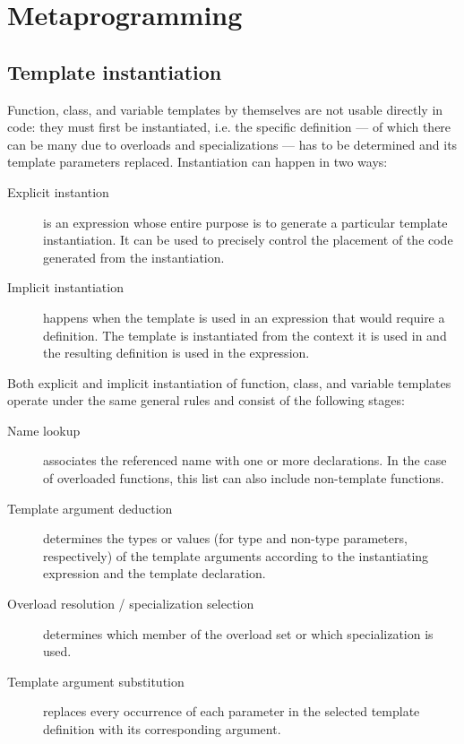 \section{Metaprogramming}

\label{sec:c++:meta}

\subsection{Template instantiation}

Function, class, and variable templates by themselves are not usable directly in
code: they must first be instantiated, i.e. the specific definition --- of which
there can be many due to overloads and specializations --- has to be determined
and its template parameters replaced.  Instantiation can happen in two ways:

\begin{description}
    \item[Explicit instantion]
        is an expression whose entire purpose is to generate a particular
        template instantiation.  It can be used to precisely control the
        placement of the code generated from the instantiation.
    \item[Implicit instantiation]
        happens when the template is used in an expression that would require a
        definition.  The template is instantiated from the context it is used in
        and the resulting definition is used in the expression.
\end{description}

Both explicit and implicit instantiation of function, class, and variable
templates operate under the same general rules and consist of the following
stages:

\begin{description}
    \item[Name lookup]
        associates the referenced name with one or more declarations.  In the
        case of overloaded functions, this list can also include non-template
        functions.
    \item[Template argument deduction]
        determines the types or values (for type and non-type parameters,
        respectively) of the template arguments according to the instantiating
        expression and the template declaration.
    \item[Overload resolution / specialization selection]
        determines which member of the overload set or which specialization is
        used.
    \item[Template argument substitution]
        replaces every occurrence of each parameter in the selected template
        definition with its corresponding argument.
\end{description}

